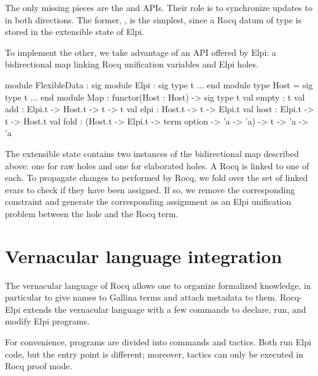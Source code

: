 \documentclass{these-ISSS}
\newenvironment{ocamlcode}
  {\VerbatimEnvironment\begin{ocamlbox}\begin{xocamlcode}}{\end{xocamlcode}
\end{ocamlbox}}
\begin{document}
The only missing pieces are the  and 
APIs. Their role is to synchronize updates to  in both
directions. The former, , is the simplest, since a Rocq
datum of type  is stored in the extensible state of Elpi.

To implement the other, we take advantage of an API offered by Elpi: a
bidirectional map linking Rocq unification variables and Elpi holes.

\begin{ocamlcode}
module FlexibleData : sig
  module Elpi : sig type t ... end
  module type Host = sig type t ... end
  module Map : functor(Host : Host) -> sig
    type t
    val empty : t
    val add   : Elpi.t -> Host.t -> t -> t
    val elpi  : Host.t -> t -> Elpi.t
    val host  : Elpi.t -> t -> Host.t
    val fold  :
      (Host.t -> Elpi.t -> term option -> 'a -> 'a) -> t -> 'a -> 'a
\end{ocamlcode}

\noindent
The extensible state contains two instances of the bidirectional map
described above: one for raw holes and one for elaborated holes. A Rocq
 is linked to one of each.
To propagate changes to  performed by Rocq, we fold
over the set of linked evars to check if they have been assigned. If so, we
remove the corresponding  constraint and generate the corresponding
assignment as an Elpi unification problem between the hole and the Rocq term.



\section{Vernacular language integration}


The vernacular language of Rocq allows one to organize formalized knowledge,
in particular to give names to Gallina terms and attach metadata to them.
Rocq-Elpi extends the vernacular language with a few commands to declare, run,
and modify Elpi programs.

For convenience, programs are divided into commands and tactics. Both run Elpi
code, but the entry point is different; moreover, tactics can only be executed
in Rocq proof mode.
\end{document}
